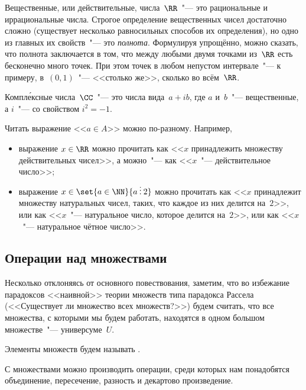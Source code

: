 \begin{example}
	Вещественные, или действительные, числа~$\RR$~"--- это рациональные и
	иррациональные числа. Строгое определение вещественных чисел достаточно
	сложно (существует несколько равносильных способов их определения), но одно
	из главных их свойств~"--- это \emph{полнота}. Формулируя упрощённо, можно
	сказать, что полнота заключается в том, что между любыми двумя точками
	из~$\RR$ есть бесконечно много точек. При этом точек в любом непустом
	интервале~"--- к примеру, в~$(0, 1)$~"--- <<столько же>>, сколько во
	всём~$\RR$.
\end{example}

\begin{example}
	Компл\'{е}ксные числа~$\CC$~"--- это числа вида~$a + ib$, где $a$ и~$b$~"---
	вещественные, а $i$~"---  со свойством $i^2 = -1$.
\end{example}

\begin{example}
	Читать выражение <<$a \in A$>> можно по-разному.
	Например,
	\begin{itemize}
		\item выражение $x \in \RR$ можно прочитать как <<$x$ принадлежить
			множеству действительных чисел>>, а можно~"--- как <<$x$~"---
			действительное число>>; 
		\item выражение $x \in \set{a \in \NN}{a \mathbin{\smash{\vdots}} 2}$ можно
			прочитать как <<$x$ принадлежит множеству натуральных чисел, таких, что
			каждое из них делится на~$2$>>, или как <<$x$~"--- натуральное число,
			которое делится на~$2$>>, или как <<$x$~"--- натуральное чётное число>>.
	\end{itemize}
\end{example}

\subsection{Операции над множествами}

Несколько отклоняясь от основного повествования, заметим, что во избежание парадоксов <<наивной>> теории множеств типа парадокса Рассела (<<Существует ли множество всех множеств?>>) будем считать, что все множества, с которыми мы будем работать, находятся в одном большом множестве~"--- универсуме~$U$.

Элементы множеств будем называть .

С множествами можно производить операции, среди которых нам понадобятся объединение, пересечение, разность и декартово произведение.

